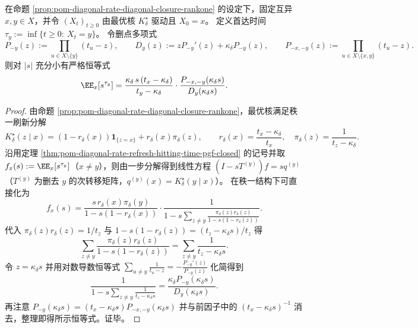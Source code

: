 \begin{theorem}\label{thm:pom-diagonal-rate-refresh-hitting-time-deleted-laguerre-pgf}
在命题 \ref{prop:pom-diagonal-rate-diagonal-closure-rankone} 的设定下，固定互异 \(x,y\in X\)，并令 \((X_t)_{t\ge 0}\) 由最优核 \(K^\star_\delta\) 驱动且 \(X_0=x\)。
定义首达时间 \(\tau_y:=\inf\{t\ge 0:\ X_t=y\}\)。
令删点多项式
\[
P_{-y}(z):=\prod_{u\in X\setminus\{y\}}(t_u-z),\qquad
D_y(z):=zP_{-y}'(z)+\kappa_\delta P_{-y}(z),
\qquad
P_{-x,-y}(z):=\prod_{u\in X\setminus\{x,y\}}(t_u-z).
\]
则对 \(|s|\) 充分小有严格恒等式
\[
\EE_x[s^{\tau_y}]
=
\frac{\kappa_\delta\,s\,(t_x-\kappa_\delta)}{t_y-\kappa_\delta}\cdot
\frac{P_{-x,-y}(\kappa_\delta s)}{D_y(\kappa_\delta s)}.
\]
\end{theorem}
\begin{proof}
由命题 \ref{prop:pom-diagonal-rate-diagonal-closure-rankone}，最优核满足秩一刷新分解
\[
K^\star_\delta(z\mid x)=(1-r_\delta(x))\mathbf 1_{\{z=x\}}+r_\delta(x)\pi_\delta(z),
\qquad
r_\delta(x)=\frac{t_x-\kappa_\delta}{t_x},\quad
\pi_\delta(z)=\frac{1}{t_z-\kappa_\delta}.
\]
沿用定理 \ref{thm:pom-diagonal-rate-refresh-hitting-time-pgf-closed} 的记号并取 \(f_x(s):=\EE_x[s^{\tau_y}]\)（\(x\ne y\)），则由一步分解得到线性方程
\(
(I-sT^{(y)})f=sq^{(y)}
\)
（\(T^{(y)}\) 为删去 \(y\) 的次转移矩阵，\(q^{(y)}(x)=K^\star_\delta(y\mid x)\)）。
在秩一结构下可直接化为
\[
f_x(s)
=\frac{s\,r_\delta(x)\pi_\delta(y)}{1-s(1-r_\delta(x))}
\cdot
\frac{1}{1-s\sum_{z\ne y}\frac{\pi_\delta(z)r_\delta(z)}{1-s(1-r_\delta(z))}}.
\]
代入 \(\pi_\delta(z)r_\delta(z)=1/t_z\) 与 \(1-s(1-r_\delta(z))=(t_z-\kappa_\delta s)/t_z\) 得
\[
\sum_{z\ne y}\frac{\pi_\delta(z)r_\delta(z)}{1-s(1-r_\delta(z))}
=\sum_{z\ne y}\frac{1}{t_z-\kappa_\delta s}.
\]
令 \(z=\kappa_\delta s\) 并用对数导数恒等式
\(
\sum_{u\ne y}\frac{1}{t_u-z}=-\frac{P_{-y}'(z)}{P_{-y}(z)}
\)
化简得到
\[
\frac{1}{1-s\sum_{z\ne y}\frac{1}{t_z-\kappa_\delta s}}
=\frac{\kappa_\delta P_{-y}(\kappa_\delta s)}{D_y(\kappa_\delta s)}.
\]
再注意 \(P_{-y}(\kappa_\delta s)=(t_x-\kappa_\delta s)P_{-x,-y}(\kappa_\delta s)\) 并与前因子中的 \((t_x-\kappa_\delta s)^{-1}\) 消去，整理即得所示恒等式。证毕。
\end{proof}

